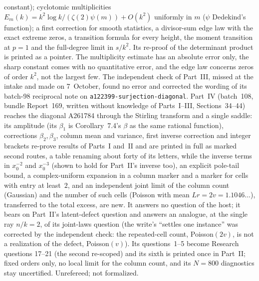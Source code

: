 \documentclass[11pt]{article}
\newcommand{\dir}[1]{\texttt{#1}}
\begin{document}
{constant); cyclotomic multiplicities
$E_m(k)=k^2\log k/(\zeta(2)\psi(m))+O(k^2)$ uniformly in $m$ ($\psi$
Dedekind's function); a first correction for smooth statistics, a
divisor-sum edge law with the exact extreme zeros, a transition formula for
every height, the moment transition at $p=1$ and the full-degree limit in
$s/k^2$.  Its re-proof of the determinant product is printed as a pointer.
The multiplicity estimate has an absolute error only, the sharp constant
comes with no quantitative error, and the edge law concerns zeros of order
$k^2$, not the largest few.  The independent check of Part~III, missed at
the intake and made on 7~October, found no error and corrected the wording
of its batch-98 reciprocal note on \dir{a122399-surjection-diagonal}.
Part~IV (batch~108, bundle Report~169,
written without knowledge of Parts~I--III, Sections~34--44)
reaches the diagonal A261784 through the Stirling transform and a single
saddle: its amplitude (its $\beta_1$ is Corollary~7.4's $\beta$ as the same
rational function), corrections $\beta_2,\beta_3$, column mean and variance,
first inverse correction and integer brackets re-prove results of Parts~I
and~II and are printed in full as marked second routes, a table renaming
about forty of its letters, while the inverse terms in $x_0^{-2}$ and
$x_0^{-3}$ (shown to hold for Part~II's inverse too), an explicit pole-tail
bound, a complex-uniform expansion in a column marker and a marker for
cells with entry at least~$2$, and an independent joint limit of the
column count (Gaussian) and the number of such cells (Poisson with mean
$Lr=2v=1.1046\ldots$), transferred to the total excess, are new.  It
answers no question of the host; it bears on Part~II's latent-defect
question and answers an analogue, at the single ray $n/k=2$, of its
joint-laws question (the write's ``settles one instance'' was corrected by
the independent check: the repeated-cell count, Poisson$(2v)$, is not a
realization of the defect, Poisson$(v)$).  Its questions~1--5 become
Research questions 17--21 (the second re-scoped) and its sixth is printed
once in Part~II; fixed orders only, no local limit
for the column count, and its $N=800$ diagnostics stay uncertified.
Unrefereed; not formalized.}
\end{document}
